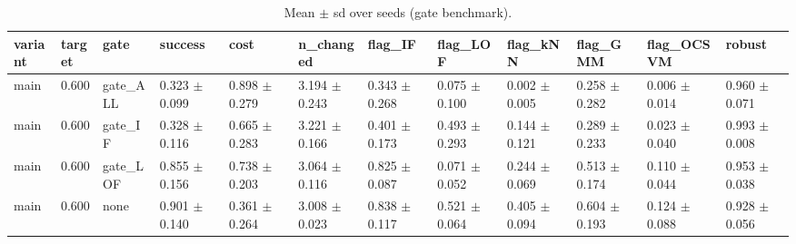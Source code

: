 \begin{table}[t]
\centering
\caption{Mean $\pm$ sd over seeds (gate benchmark).}
\label{tab:gate_benchmark_summary}
\small
\begin{tabular}{llllllllllll}
\toprule
variant & target & gate & success & cost & n\_changed & flag\_IF & flag\_LOF & flag\_kNN & flag\_GMM & flag\_OCSVM & robust \\
\midrule
main & 0.600 & gate\_ALL & 0.323 $\pm$ 0.099 & 0.898 $\pm$ 0.279 & 3.194 $\pm$ 0.243 & 0.343 $\pm$ 0.268 & 0.075 $\pm$ 0.100 & 0.002 $\pm$ 0.005 & 0.258 $\pm$ 0.282 & 0.006 $\pm$ 0.014 & 0.960 $\pm$ 0.071 \\
main & 0.600 & gate\_IF & 0.328 $\pm$ 0.116 & 0.665 $\pm$ 0.283 & 3.221 $\pm$ 0.166 & 0.401 $\pm$ 0.173 & 0.493 $\pm$ 0.293 & 0.144 $\pm$ 0.121 & 0.289 $\pm$ 0.233 & 0.023 $\pm$ 0.040 & 0.993 $\pm$ 0.008 \\
main & 0.600 & gate\_LOF & 0.855 $\pm$ 0.156 & 0.738 $\pm$ 0.203 & 3.064 $\pm$ 0.116 & 0.825 $\pm$ 0.087 & 0.071 $\pm$ 0.052 & 0.244 $\pm$ 0.069 & 0.513 $\pm$ 0.174 & 0.110 $\pm$ 0.044 & 0.953 $\pm$ 0.038 \\
main & 0.600 & none & 0.901 $\pm$ 0.140 & 0.361 $\pm$ 0.264 & 3.008 $\pm$ 0.023 & 0.838 $\pm$ 0.117 & 0.521 $\pm$ 0.064 & 0.405 $\pm$ 0.094 & 0.604 $\pm$ 0.193 & 0.124 $\pm$ 0.088 & 0.928 $\pm$ 0.056 \\
\bottomrule
\end{tabular}
\end{table}
